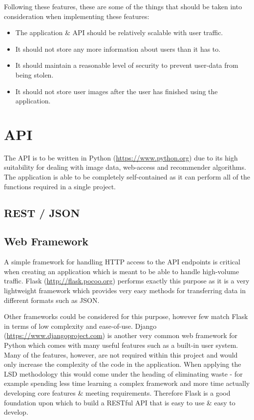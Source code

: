 \documentclass[a4paper,12pt]{report}
\begin{document}
    Following these features, these are some of the things that should be taken into consideration when implementing these features:

      \begin{itemize}
        \item The application \& API should be relatively scalable with user traffic.
        \item It should not store any more information about users than it has to.
        \item It should maintain a reasonable level of security to prevent user-data from being stolen.
        \item It should not store user images after the user has finished using the application.
      \end{itemize}

  \section{API}
    The API is to be written in Python (\url{https://www.python.org}) due to its high suitability for dealing with image data, web-access and recommender algorithms. The application is able to be completely self-contained as it can perform all of the functions required in a single project.

    \subsection{REST / JSON}

    \subsection{Web Framework}
      A simple framework for handling HTTP access to the API endpoints is critical when creating an application which is meant to be able to handle high-volume traffic. Flask (\url{http://flask.pocoo.org}) performs exactly this purpose as it is a very lightweight framework which provides very easy methods for transferring data in different formats such as JSON.

      Other frameworks could be considered for this purpose, however few match Flask in terms of low complexity and ease-of-use. Django (\url{https://www.djangoproject.com}) is another very common web framework for Python which comes with many useful features such as a built-in user system. Many of the features, however, are not required within this project and would only increase the complexity of the code in the application. When applying the LSD methodology \citep{poppendieck2003lean} this would come under the heading of eliminating waste - for example spending less time learning a complex framework and more time actually developing core features \& meeting requirements. Therefore Flask is a good foundation upon which to build a RESTful API that is easy to use \& easy to develop.
\end{document}
